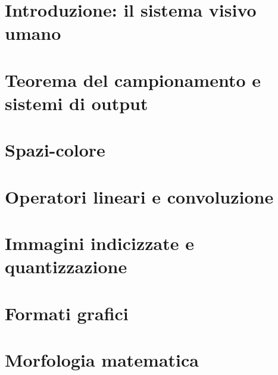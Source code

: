 \documentclass{article}
\begin{document}


\tableofcontents
\restoregeometry

\section{Introduzione: il sistema visivo umano}


\section{Teorema del campionamento e sistemi di output}


\section{Spazi-colore}


\section{Operatori lineari e convoluzione}


\section{Immagini indicizzate e quantizzazione}


\section{Formati grafici}


\section{Morfologia matematica}

\end{document}
